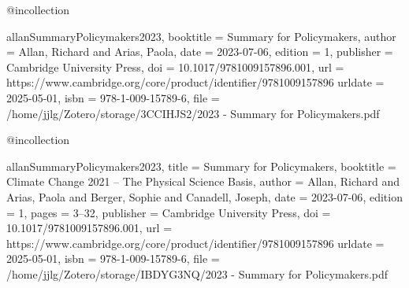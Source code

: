 {@incollection{allanSummaryPolicymakers2023,
  booktitle = {Summary for {{Policymakers}}},
  author = {Allan, Richard and Arias, Paola},
  date = {2023-07-06},
  edition = {1},
  publisher = {Cambridge University Press},
  doi = {10.1017/9781009157896.001},
  url = {https://www.cambridge.org/core/product/identifier/9781009157896%
  urldate = {2025-05-01},
  isbn = {978-1-009-15789-6},
  file = {/home/jjlg/Zotero/storage/3CCIHJS2/2023 - Summary for Policymakers.pdf}
}

@incollection{allanSummaryPolicymakers2023,
  title = {Summary for {{Policymakers}}},
  booktitle = {Climate {{Change}} 2021 – {{The Physical Science Basis}}},
  author = {Allan, Richard and Arias, Paola and Berger, Sophie and Canadell, Joseph},
  date = {2023-07-06},
  edition = {1},
  pages = {3--32},
  publisher = {Cambridge University Press},
  doi = {10.1017/9781009157896.001},
  url = {https://www.cambridge.org/core/product/identifier/9781009157896%
  urldate = {2025-05-01},
  isbn = {978-1-009-15789-6},
  file = {/home/jjlg/Zotero/storage/IBDYG3NQ/2023 - Summary for Policymakers.pdf}
}

}}}
